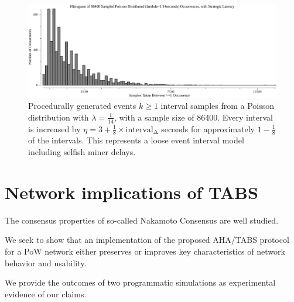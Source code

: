 \documentclass[11pt]{article}
\theoremstyle{plain}
\begin{document}
\begin{figure}[tph]
    \centering

    \includegraphics[width=1.0\textwidth]{go-block-step/out/vis_poisson_samples_eventintervals_latencysamesamestrat_hist.png}
    \caption{
        Procedurally generated events $k \geq 1$ interval samples from a Poisson distribution
        with $\lambda = \frac{1}{14}$, with a sample size of 86400.
        Every interval is increased by $\eta=3 + \frac{1}{8} \times \mathrm{interval_{\Delta}}$ seconds for approximately
        $1-\frac{1}{8}$ of the intervals.
        This represents a loose event interval model including selfish miner delays.
    }
\end{figure}


%
%


\section{\normalsize{Network implications of TABS}}

The consensus properties of so-called Nakamoto Consensus are well studied.

We seek to show that an implementation of the proposed AHA/TABS protocol for a PoW network
either preserves or improves key characteristics of network behavior and usability.

We provide the outcomes of two programmatic simulations as experimental evidence of our claims.
\end{document}
